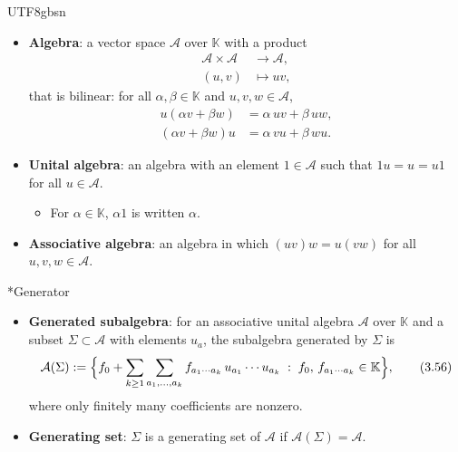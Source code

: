 \documentclass[11pt,a4paper,oneside]{report}
\makeatletter
\newcommand\topic{\@startsection{paragraph}{4}{\z@}{-1.7ex plus -.3ex}{.5ex}{\normalfont\normalsize\bfseries\itshape\boldmath}*}
\makeatother
\begin{document}
\begin{CJK*}{UTF8}{gbsn}
\begin{itemize}
\item \textbf{\boldmath Algebra}: a vector space $\mathcal A$ over $\mathbb K$ with a product
\begin{equation*}
\begin{aligned}
\mathcal A\times\mathcal A&\to\mathcal A,\\
(u,v)&\mapsto uv,
\end{aligned}
\tag{3.54}\label{eq:3.54}
\end{equation*}
that is bilinear: for all $\alpha,\beta\in\mathbb K$ and $u,v,w\in\mathcal A$,
\begin{equation*}
\begin{aligned}
u(\alpha v+\beta w)&=\alpha\,uv+\beta\,uw,\\
(\alpha v+\beta w)u&=\alpha\,vu+\beta\,wu.
\end{aligned}
\tag{3.55}\label{eq:3.55}
\end{equation*}

\item \textbf{\boldmath Unital algebra}: an algebra with an element $1\in\mathcal A$ such that $1u=u=u1$ for all $u\in\mathcal A$.
\begin{itemize}


\item For $\alpha\in\mathbb K$, $\alpha1$ is written $\alpha$.
\end{itemize}


\item \textbf{\boldmath Associative algebra}: an algebra in which $(uv)w=u(vw)$ for all $u,v,w\in\mathcal A$.
\end{itemize}


\topic{Generator}
\begin{itemize}


\item \textbf{\boldmath Generated subalgebra}: for an associative unital algebra $\mathcal A$ over $\mathbb K$ and a subset $\Sigma\subset\mathcal A$ with elements $u_a$, the subalgebra generated by $\Sigma$ is
\begin{equation*}
\mathcal A(\Sigma):=\Bigl\{f_0+\sum_{k\ge1}\sum_{a_1,\ldots,a_k}f_{a_1\cdots a_k}\,u_{a_1}\cdots u_{a_k}\;:\;f_0,\,f_{a_1\cdots a_k}\in\mathbb K\Bigr\},
\tag{3.56}\label{eq:3.56}
\end{equation*}
where only finitely many coefficients are nonzero.

\item \textbf{\boldmath Generating set}: $\Sigma$ is a generating set of $\mathcal A$ if $\mathcal A(\Sigma)=\mathcal A$.
\end{itemize}



\end{CJK*}
\end{document}

